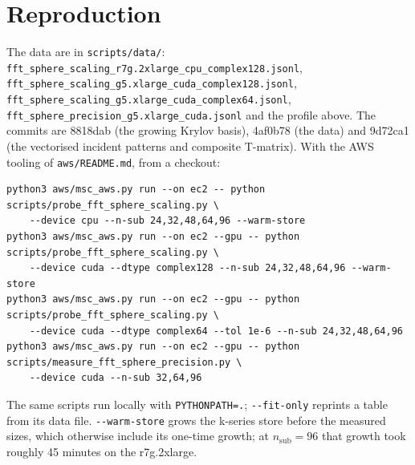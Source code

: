 \documentclass[11pt,a4paper]{article}
\newcommand{\nsub}{n_{\mathrm{sub}}}
\newcommand{\code}[1]{\nolinkurl{#1}}
\begin{document}
\section{Reproduction}\label{sec:repro}

The data are in \code{scripts/data/}: \code{fft_sphere_scaling_r7g.2xlarge_cpu_complex128.jsonl},
\code{fft_sphere_scaling_g5.xlarge_cuda_complex128.jsonl}, \code{fft_sphere_scaling_g5.xlarge_cuda_complex64.jsonl},
\code{fft_sphere_precision_g5.xlarge_cuda.jsonl} and the profile above. The commits are 8818dab (the growing Krylov
basis), 4af0b78 (the data) and 9d72ca1 (the vectorised incident patterns and composite T-matrix). With the AWS
tooling of \code{aws/README.md}, from a checkout:

{\footnotesize
\begin{verbatim}
python3 aws/msc_aws.py run --on ec2 -- python scripts/probe_fft_sphere_scaling.py \
    --device cpu --n-sub 24,32,48,64,96 --warm-store
python3 aws/msc_aws.py run --on ec2 --gpu -- python scripts/probe_fft_sphere_scaling.py \
    --device cuda --dtype complex128 --n-sub 24,32,48,64,96 --warm-store
python3 aws/msc_aws.py run --on ec2 --gpu -- python scripts/probe_fft_sphere_scaling.py \
    --device cuda --dtype complex64 --tol 1e-6 --n-sub 24,32,48,64,96
python3 aws/msc_aws.py run --on ec2 --gpu -- python scripts/measure_fft_sphere_precision.py \
    --device cuda --n-sub 32,64,96
\end{verbatim}
}

\noindent
The same scripts run locally with \code{PYTHONPATH=.}; \code{--fit-only} reprints a table from its data file.
\code{--warm-store} grows the k-series store before the measured sizes, which otherwise include its one-time growth;
at $\nsub = 96$ that growth took roughly 45 minutes on the r7g.2xlarge.
\end{document}

